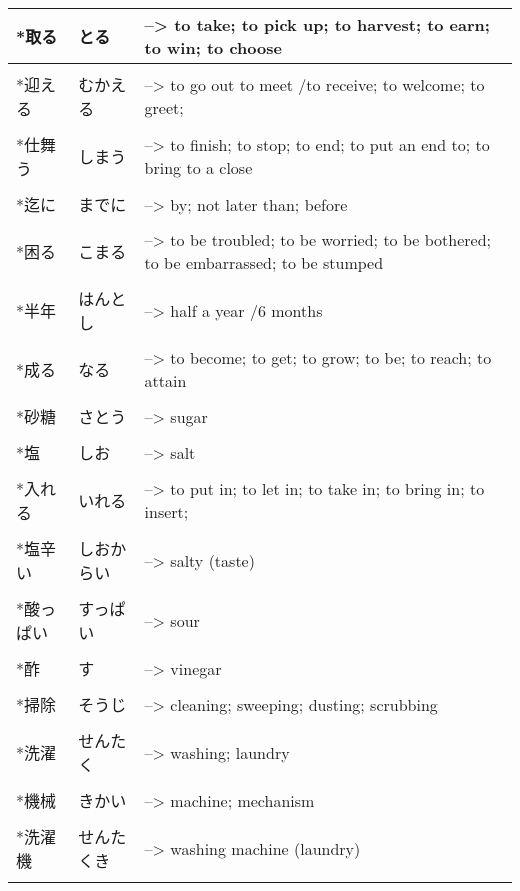 \documentclass{article}
\begin{document}
\begin{tabular}{ l | l p{13cm} }
*取る&とる&--> to take; to pick up; to harvest; to earn; to win; to choose \\ \hline\\[-1em]
*迎える&むかえる&--> to go out to meet /to receive; to welcome; to greet; \\ \hline\\[-1em]
*仕舞う&しまう&--> to finish; to stop; to end; to put an end to; to bring to a close \\ \hline\\[-1em]
*迄に&までに&--> by; not later than; before \\ \hline\\[-1em]
*困る&こまる&--> to be troubled; to be worried; to be bothered; to be embarrassed; to be stumped \\ \hline\\[-1em]
*半年&はんとし&--> half a year /6 months \\ \hline\\[-1em]
*成る&なる&--> to become; to get; to grow; to be; to reach; to attain \\ \hline\\[-1em]
*砂糖&さとう&--> sugar \\ \hline\\[-1em]
*塩&しお&--> salt \\ \hline\\[-1em]
*入れる&いれる&--> to put in; to let in; to take in; to bring in; to insert; \\ \hline\\[-1em]
*塩辛い&しおからい&--> salty (taste) \\ \hline\\[-1em]
*酸っぱい&すっぱい&--> sour \\ \hline\\[-1em]
*酢&す&--> vinegar \\ \hline\\[-1em]
*掃除&そうじ&--> cleaning; sweeping; dusting; scrubbing \\ \hline\\[-1em]
*洗濯&せんたく&--> washing; laundry \\ \hline\\[-1em]
*機械&きかい&--> machine; mechanism \\ \hline\\[-1em]
*洗濯機&せんたくき&--> washing machine (laundry) \\ \hline\\[-1em]

\end{tabular}
\end{document}
